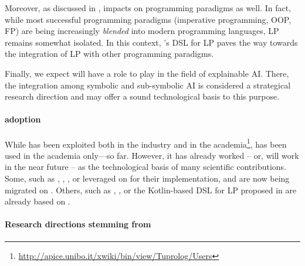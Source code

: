 \documentclass[12pt,a4paper,openright,twoside]{book}
\begin{document}
Moreover, as discussed in \cite{kotlindsi4prolog-woa2020}, \twopkt{} impacts on programming paradigms as well.
%
In fact, while most successful programming paradigms (imperative programming, OOP, FP) are being increasingly \emph{blended} into modern programming languages, LP remains somewhat isolated.
%
In this context, \twopkt{}'s DSL for LP paves the way towards the integration of LP with other programming paradigms.

Finally, we expect \twopkt{} will have a role to play in the field of explainable AI.
%
There, the integration among symbolic and sub-symbolic AI is considered a strategical research direction \cite{xaisurvey-ia14} and \twopkt{} may offer a sound technological basis to this purpose.

\paragraph{\twopkt{} adoption}

While \tuprolog{} has been exploited both in the industry and in the academia\footnote{\url{http://apice.unibo.it/xwiki/bin/view/Tuprolog/Users}}, \twopkt{} has been used in the academia only---so far.
%
However, it has already worked -- or, will work in the near future -- as the technological basis of many scientific contributions.
%
Some, such as \tucson{} \cite{tucson-jaamas2}, \respect{} \cite{respect-scp41}, \lpaas{} \cite{lpaas-bdcc2}, or \tenderfone{} \cite{blockchainmas-applsci10} leveraged on \tuprolog{} for their implementation, and are now being migrated on \twopkt{}.
%
Others, such as \tusow{} \cite{tusow-icccn2019}, \argtwop{} \cite{arg2p-cilc2020}, or the Kotlin-based DSL for LP proposed in \cite{kotlindsi4prolog-woa2020} are already based on \twopkt{}.

\paragraph{Research directions stemming from \twopkt{}}
\end{document}
